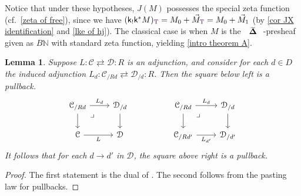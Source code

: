 \documentclass{amsart}
\makeatletter
\newcommand{\simpl}{\mathbf{\Delta}}
\def\overarrow#1{{\vec{#1}}}
\def\nondeg{\overarrow}
\newcommand*\wt[1]{\mathpalette\wthelper{#1}}
\newcommand*\wthelper[2]{%
        \hbox{\dimen@\accentfontxheight#1%
                \accentfontxheight#11.3\dimen@
                $\m@th#1\widetilde{#2}$%
                \accentfontxheight#1\dimen@
        }%
}
\newcommand*\accentfontxheight[1]{%
        \fontdimen5\ifx#1\displaystyle
                \textfont
        \else\ifx#1\textstyle
                \textfont
        \else\ifx#1\scriptstyle
                \scriptfont
        \else
                \scriptscriptfont
        \fi\fi\fi3
}
\newcommand{\Tsimpl}{\wt\simpl}
\newcommand{\Tob}{\textup{\color{Indigo}T}}
\newcommand{\lilk}{\mathsf{k}}
\newcommand{\N}{\mathbb{N}}
\newcommand{\drpullback}{\arrow[phantom]{dr}[very near start,description]{\lrcorner}}
\newtheorem{lemma}[theorem]{Lemma}
\theoremstyle{definition}
\theoremstyle{noname}
\makeatother
\begin{document}
Notice that under these hypotheses, $J(M)$ possesses the special zeta function (cf.\ \ref{zeta of free}), since we have $(\lilk_! \lilk^* M)_\Tob = M_0 + \nondeg M_\Tob = M_0 + \nondeg M_1$ (by \cref{cor JX identification} and \cref{lke of hj}).
The classical case is when $M$ is the $\Tsimpl$-presheaf given as
$B\N$ with standard zeta function, yielding \cref{intro theorem A}.


\begin{lemma}\label{lem slice pullback}
Suppose 
$L : \mathcal{C} \rightleftarrows \mathcal{D} : R$ is an adjunction, and consider for each $d\in D$
the induced adjunction $L_d : \mathcal{C}_{/Rd} \rightleftarrows \mathcal{D}_{/d} : R$.
Then the square below left is a pullback.
\[ \begin{tikzcd}
\mathcal{C}_{/Rd} \rar{L_d} \dar \drpullback & \mathcal{D}_{/d} \dar & & \mathcal{C}_{/Rd} \rar{L_d} \dar \drpullback & \mathcal{D}_{/d} \dar \\
\mathcal{C} \rar[swap]{L} & \mathcal{D} & & \mathcal{C}_{/Rd'} \rar[swap]{L_{d'}}  & \mathcal{D}_{/d'}
\end{tikzcd} 
\]
It follows that for each $d\to d'$ in $\mathcal{D}$, the square above right is a pullback.
\end{lemma}
\begin{proof}
The first statement is the dual of \cite[Lemma 2.1.1]{SchlankYanovski:ICEHA}.
The second follows from the pasting law for pullbacks.
\end{proof}
\end{document}
